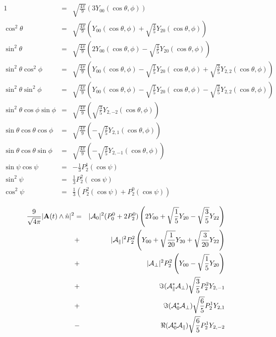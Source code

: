 \documentclass[a4paper,9pt,twoside]{article}
\begin{document}
\begin{eqnarray}
  1                       &=& \sqrt{ \frac{4\pi}{9} } \left( 3 Y_{00}(\cos\theta,\phi) \right) \\
  \cos^2\theta            &=& \sqrt{ \frac{4\pi}{9} } \left( Y_{00}(\cos\theta,\phi) + \sqrt{\frac{4}{5}}Y_{20}(\cos\theta,\phi)\right)\\
  \sin^2\theta            &=& \sqrt{ \frac{4\pi}{9} } \left( 2Y_{00}(\cos\theta,\phi) - \sqrt{\frac{4}{5}}Y_{20}(\cos\theta,\phi)\right)\\
  \sin^2\theta \cos^2\phi &=& \sqrt{ \frac{4\pi}{9} } \left( Y_{00}(\cos\theta,\phi) - \sqrt{\frac{1}{5} }Y_{20}(\cos\theta,\phi) +\sqrt{\frac{3}{5}} Y_{2,2}(\cos\theta,\phi)\right) \\
  \sin^2\theta \sin^2\phi &=& \sqrt{ \frac{4\pi}{9} } \left( Y_{00}(\cos\theta,\phi) - \sqrt{\frac{1}{5} }Y_{20}(\cos\theta,\phi) -\sqrt{\frac{3}{5}} Y_{2,2}(\cos\theta,\phi)\right) \\
  \sin^2\theta\cos\phi\sin\phi &=& \sqrt{ \frac{4\pi}{9}} \left(\sqrt{\frac{3}{5}} Y_{2,-2}(\cos\theta,\phi) \right) \\
  \sin\theta\cos\theta\cos\phi &=& \sqrt{ \frac{4\pi}{9}}\left( -\sqrt{\frac{3}{5}}Y_{2,1}(\cos\theta,\phi)\right) \\ 
  \sin\theta\cos\theta\sin\phi &=& \sqrt{ \frac{4\pi}{9}}\left( -\sqrt{\frac{3}{5}}Y_{2,-1}(\cos\theta,\phi) \right) \\
  \sin\psi\cos\psi &=& -\frac{1}{3} P_2^1(\cos\psi) \\
  \sin^2 \psi      &=&  \frac{1}{3} P_2^2(\cos\psi) \\
  \cos^2 \psi      &=&  \frac{1}{3} \left( P_2^2(\cos\psi)+P_2^0(\cos\psi) \right)
\end{eqnarray}

\begin{eqnarray}
\frac{9 }{\sqrt{4\pi}} |{ \bf A}(t) \wedge \hat{n}|^2 
                              &=&|{\cal A}_0|^2  (P_0^0+2P_2^0 ) \left( 2 Y_{00}+\sqrt{\frac{1}{5}}Y_{20}-\sqrt{\frac{3}{5}}Y_{22} \right) \\
                              &+&|{\cal A}_\parallel|^2 P_2^2 \left( Y_{00}+\sqrt{\frac{1}{20}}Y_{20}+\sqrt{\frac{3}{20}}Y_{22}  \right)  \\
                              &+&|{\cal A}_\perp|^2  P_2^2 \left( Y_{00} - \sqrt{\frac{1}{5}}Y_{20}\right)\\
                              &+&\Im({\cal A}_\parallel^*{\cal A}_\perp) \sqrt{\frac{3}{5}}P_2^2 Y_{2,-1}  \\
                              &+&\Im({\cal A}_0^* {\cal A}_\perp )       \sqrt{\frac{6}{5}}P_2^1Y_{2,1} \\
                              &-&\Re({\cal A}_0^*{\cal A}_\parallel  )   \sqrt{\frac{6}{5}}P_2^1 Y_{2,-2} 
\end{eqnarray}
\end{document}
